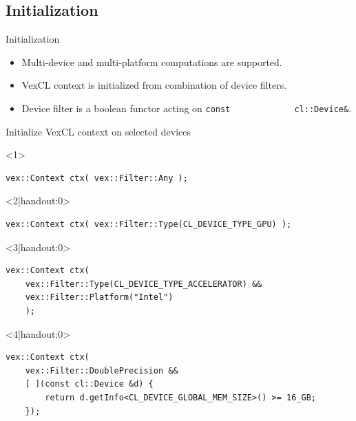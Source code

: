 \documentclass[@BEAMER_OPTIONS@]{beamer}
\newcommand{\code}[1]{\lstinline|#1|}
\begin{document}
\subsection{Initialization}
\begin{frame}[fragile]{Initialization}
    \begin{itemize}
        \item Multi-device and multi-platform computations are supported.
        \item VexCL context is initialized from combination of device filters.
        \item Device filter is a boolean functor acting on \code{const
            cl::Device&}.
    \end{itemize}
    \vspace{-0.5\baselineskip}
    \begin{overlayarea}{\textwidth}{0.4\textheight}
    \begin{exampleblock}{Initialize VexCL context on selected devices}
        \begin{onlyenv}<1>
        \begin{lstlisting}
vex::Context ctx( vex::Filter::Any );
        \end{lstlisting}
        \end{onlyenv}
        \begin{onlyenv}<2|handout:0>
        \begin{lstlisting}
vex::Context ctx( vex::Filter::Type(CL_DEVICE_TYPE_GPU) );
        \end{lstlisting}
        \end{onlyenv}
        \begin{onlyenv}<3|handout:0>
        \begin{lstlisting}
vex::Context ctx(
    vex::Filter::Type(CL_DEVICE_TYPE_ACCELERATOR) &&
    vex::Filter::Platform("Intel")
    );
        \end{lstlisting}
        \end{onlyenv}
        \begin{onlyenv}<4|handout:0>
        \begin{lstlisting}
vex::Context ctx(
    vex::Filter::DoublePrecision &&
    [ ](const cl::Device &d) {
        return d.getInfo<CL_DEVICE_GLOBAL_MEM_SIZE>() >= 16_GB;
    });
        \end{lstlisting}
        \end{onlyenv}
    \end{exampleblock}

\end{overlayarea}
\end{frame}
\end{document}
